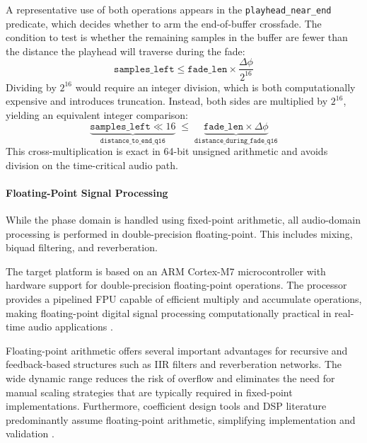 A representative use of both operations appears in the \texttt{playhead\_near\_end} predicate, which decides whether to arm the end-of-buffer crossfade.
The condition to test is whether the remaining samples in the buffer are fewer than the distance the playhead will traverse during the fade:
\begin{equation}
\texttt{samples\_left} \leq \texttt{fade\_len} \times \frac{\Delta\phi}{2^{16}}
\end{equation}
Dividing by $2^{16}$ would require an integer division, which is both computationally expensive and introduces truncation. 
Instead, both sides are multiplied by $2^{16}$, yielding an equivalent integer comparison:
\begin{equation}
\underbrace{\texttt{samples\_left} \ll 16}_{\texttt{distance\_to\_end\_q16}}
\;\leq\;
\underbrace{\texttt{fade\_len} \times \Delta\phi}_{\texttt{distance\_during\_fade\_q16}}
\end{equation}
This cross-multiplication is exact in 64-bit unsigned arithmetic and avoids division on the time-critical audio path.

\paragraph{Floating-Point Signal Processing}

While the phase domain is handled using fixed-point arithmetic, all audio-domain processing is performed in double-precision floating-point. This includes mixing, biquad filtering, and reverberation.

The target platform is based on an ARM Cortex-M7 microcontroller with hardware support for double-precision floating-point operations. 
The processor provides a pipelined \ac{FPU} capable of efficient multiply and accumulate operations, making floating-point digital signal processing computationally practical in real-time audio applications \cite{ArmCortexM7Processor}.

Floating-point arithmetic offers several important advantages for recursive and feedback-based structures such as IIR filters and reverberation networks. 
The wide dynamic range reduces the risk of overflow and eliminates the need for manual scaling strategies that are typically required in fixed-point implementations. 
Furthermore, coefficient design tools and DSP literature predominantly assume floating-point arithmetic, simplifying implementation and validation \cite[p.295]{lyonsUnderstandingDigitalSignal2011}.

